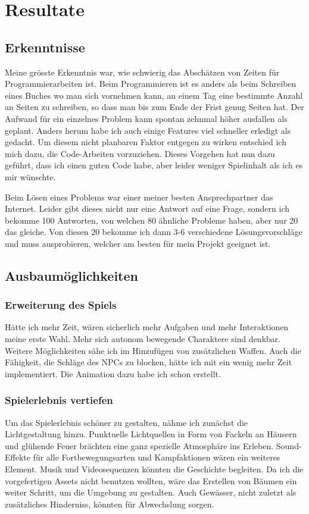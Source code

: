 \chapter{Resultate}

\section{Erkenntnisse}
Meine grösste Erkenntnis war, wie schwierig das Abschätzen von Zeiten für Programmierarbeiten ist. Beim Programmieren ist es anders als beim Schreiben eines Buches wo man sich vornehmen kann, an einem Tag eine bestimmte Anzahl an Seiten zu schreiben, so dass man bis zum Ende der Frist genug Seiten hat.
Der Aufwand für ein einzelnes Problem kann spontan zehnmal höher ausfallen als geplant. Anders herum habe ich auch einige Features viel schneller erledigt als gedacht.
Um diesem nicht planbaren Faktor entgegen zu wirken entschied ich mich dazu, die Code-Arbeiten vorzuziehen.
Dieses Vorgehen hat nun dazu geführt, dass ich einen guten Code habe, aber leider weniger Spielinhalt als ich es mir wünschte.

Beim Lösen eines Problems war einer meiner besten Ansprechpartner das Internet.
Leider gibt dieses nicht nur eine Antwort auf eine Frage, sondern ich bekomme 100 Antworten, von welchen 80 ähnliche Probleme haben, aber nur 20 das gleiche.
Von diesen 20 bekomme ich dann 3-6 verschiedene Lösungsvorschläge und muss ausprobieren, welcher am besten für mein Projekt geeignet ist.

\section{Ausbaumöglichkeiten}

\subsection{Erweiterung des Spiels}
Hätte ich mehr Zeit, wären sicherlich mehr Aufgaben und mehr Interaktionen meine erste Wahl. Mehr sich autonom bewegende Charaktere sind denkbar. Weitere Möglichkeiten sähe ich im Hinzufügen von zusätzlichen Waffen. Auch die Fähigkeit, die Schläge des NPCs zu blocken, hätte ich mit ein wenig mehr Zeit implementiert. Die Animation dazu habe ich schon erstellt.

\subsection{Spielerlebnis vertiefen}
Um das Spielerlebnis schöner zu gestalten, nähme ich zunächst die Lichtgestaltung hinzu. Punktuelle Lichtquellen in Form von Fackeln an Häusern und glühende Feuer brächten eine ganz spezielle Atmosphäre ins Erleben. Sound-Effekte für alle Fortbewegungsarten und Kampfaktionen wären ein weiteres Element. Musik und Videosequenzen könnten die Geschichte begleiten. Da ich die vorgefertigen Assets nicht benutzen wollten, wäre das Erstellen von Bäumen ein weiter Schritt, um die Umgebung zu gestalten. Auch Gewässer, nicht zuletzt als zusätzliches Hinderniss, könnten für Abwechslung sorgen.

